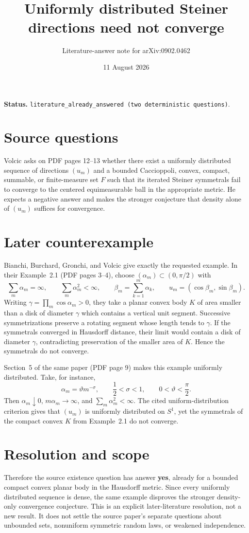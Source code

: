 \documentclass[11pt]{article}
\title{Uniformly distributed Steiner directions need not converge}
\author{Literature-answer note for arXiv:0902.0462}
\date{11 August 2026}
\begin{document}
\maketitle

\noindent\textbf{Status.}
\texttt{literature\_already\_answered (two deterministic questions)}.

\section*{Source questions}
Volcic \cite{Volcic} asks on PDF pages 12--13 whether there exist a uniformly
distributed sequence of directions $(u_m)$ and a bounded Caccioppoli, convex,
compact, summable, or finite-measure set $F$ such that its iterated Steiner
symmetrals fail to converge to the centered equimeasurable ball in the
appropriate metric.  He expects a negative answer and makes the stronger
conjecture that density alone of $(u_m)$ suffices for convergence.

\section*{Later counterexample}
Bianchi, Burchard, Gronchi, and Volcic \cite{BBGV} give exactly the requested
example.  In their Example~2.1 (PDF pages 3--4), choose
$(\alpha_m)\subset(0,\pi/2)$ with
\[
  \sum_m\alpha_m=\infty,
  \qquad \sum_m\alpha_m^2<\infty,
  \qquad
  \beta_m=\sum_{k=1}^m\alpha_k,
  \qquad
  u_m=(\cos\beta_m,\sin\beta_m).
\]
Writing $\gamma=\prod_m\cos\alpha_m>0$, they take a planar convex body $K$
of area smaller than a disk of diameter $\gamma$ which contains a vertical
unit segment.  Successive symmetrizations preserve a rotating segment whose
length tends to $\gamma$.  If the symmetrals converged in Hausdorff distance,
their limit would contain a disk of diameter $\gamma$, contradicting
preservation of the smaller area of $K$.  Hence the symmetrals do not converge.

Section~5 of the same paper (PDF page 9) makes this example uniformly
distributed.  Take, for instance,
\[
  \alpha_m=\vartheta m^{-\sigma},
  \qquad \frac12<\sigma<1,
  \qquad 0<\vartheta<\frac{\pi}{2}.
\]
Then $\alpha_m\downarrow0$, $m\alpha_m\to\infty$, and
$\sum_m\alpha_m^2<\infty$.  The cited uniform-distribution criterion gives
that $(u_m)$ is uniformly distributed on $S^1$, yet the symmetrals of the
compact convex $K$ from Example~2.1 do not converge.

\section*{Resolution and scope}
Therefore the source existence question has answer \textbf{yes}, already for
a bounded compact convex planar body in the Hausdorff metric.  Since every
uniformly distributed sequence is dense, the same example disproves the
stronger density-only convergence conjecture.  This is an explicit
later-literature resolution, not a new result.  It does not settle the source
paper's separate questions about unbounded sets, nonuniform symmetric random
laws, or weakened independence.
\end{document}
